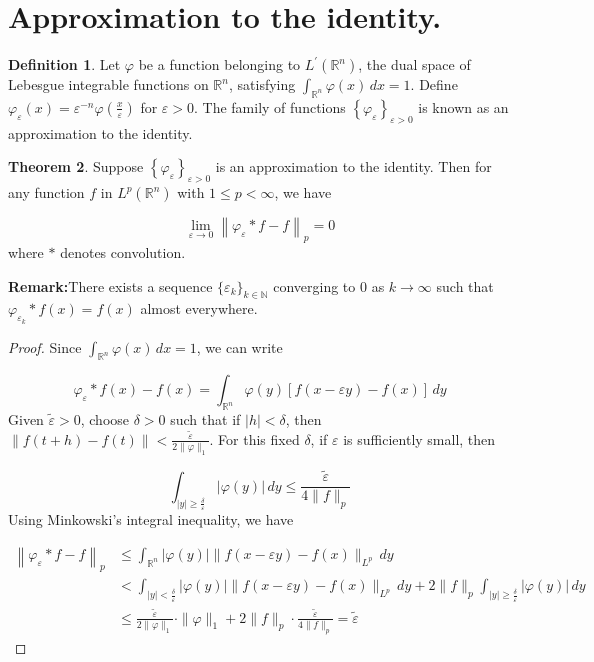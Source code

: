 \documentclass[12pt,openany]{book}
\theoremstyle{definition}
\newtheorem{theorem}{Theorem}[section]
\newtheorem{definition}[theorem]{Definition}
\begin{document}
\section{Approximation to the identity.}
\begin{definition}
    Let $\varphi$ be a function belonging to $L^{\prime}\left(\mathbb{R}^n\right)$, the dual space of Lebesgue integrable functions on $\mathbb{R}^n$, satisfying $\int_{\mathbb{R}^n} \varphi(x) \, dx = 1$. Define $\varphi_{\varepsilon}(x) = \varepsilon^{-n} \varphi\left(\frac{x}{\varepsilon}\right)$ for $\varepsilon > 0$. The family of functions $\left\{\varphi_{\varepsilon}\right\}_{\varepsilon > 0}$ is known as an approximation to the identity.
\end{definition}
\begin{theorem}
    Suppose $\left\{\varphi_{\varepsilon}\right\}_{\varepsilon > 0}$ is an approximation to the identity. Then for any function $f$ in $L^p(\mathbb{R}^n)$ with $1 \leq p < \infty$, we have

$$\lim_{\varepsilon \to 0} \left\|\varphi_{\varepsilon} * f - f\right\|_p = 0$$where $*$ denotes convolution.
\end{theorem}
\noindent\textbf{Remark:}There exists a sequence $\{\varepsilon_k\}_{k \in \mathbb{N}}$ converging to 0 as $k \to \infty$ such that $\varphi_{\varepsilon_k} * f(x) = f(x)$ almost everywhere.
\begin{proof}
    Since $\int_{\mathbb{R}^n} \varphi(x) \, dx = 1$, we can write

$$\varphi_{\varepsilon} * f(x) - f(x) = \int_{\mathbb{R}^n} \varphi(y) [f(x - \varepsilon y) - f(x)] \, dy$$Given $\tilde{\varepsilon} > 0$, choose $\delta > 0$ such that if $|h| < \delta$, then $\|f(t + h) - f(t)\| < \frac{\tilde{\varepsilon}}{2\|\varphi\|_1}$. For this fixed $\delta$, if $\varepsilon$ is sufficiently small, then

$$\int_{|y| \geq \frac{\delta}{\varepsilon}} |\varphi(y)| \, dy \leq \frac{\tilde{\varepsilon}}{4\|f\|_p}$$Using Minkowski's integral inequality, we have

$$\begin{aligned}
\left\|\varphi_{\varepsilon} * f - f\right\|_p &\leq \int_{\mathbb{R}^n} |\varphi(y)| \|f(x - \varepsilon y) - f(x)\|_{L^p} \, dy \\
&< \int_{|y| < \frac{\delta}{\varepsilon}} |\varphi(y)| \|f(x - \varepsilon y) - f(x)\|_{L^p} \, dy + 2\|f\|_p \int_{|y| \geq \frac{\delta}{\varepsilon}} |\varphi(y)| \, dy \\
&\leq \frac{\tilde{\varepsilon}}{2\|\varphi\|_1} \cdot \|\varphi\|_1 + 2\|f\|_p \cdot \frac{\tilde{\varepsilon}}{4\|f\|_p} = \tilde{\varepsilon}
\end{aligned}$$
\end{proof}
\end{document}
